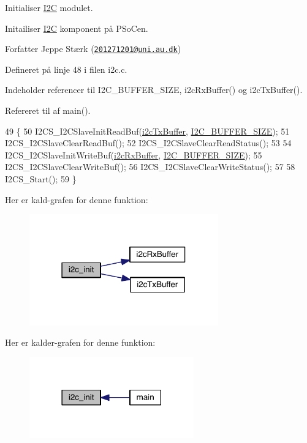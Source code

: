 Initialiser \hyperlink{class_i2_c}{I2C} modulet. 

Initailiser \hyperlink{class_i2_c}{I2C} komponent på P\+SoC\textquotesingle{}en.

\begin{DoxyAuthor}{Forfatter}
Jeppe Stærk (\href{mailto:201271201@uni.au.dk}{\tt 201271201@uni.\+au.\+dk}) 
\end{DoxyAuthor}


Defineret på linje 48 i filen i2c.\+c.



Indeholder referencer til I2\+C\+\_\+\+B\+U\+F\+F\+E\+R\+\_\+\+S\+I\+ZE, i2c\+Rx\+Buffer() og i2c\+Tx\+Buffer().



Refereret til af main().


\begin{DoxyCode}
49 \{
50   I2CS\_I2CSlaveInitReadBuf(\hyperlink{class_i2_c_a58ba88cddd7843f12a40a87c998f00da}{i2cTxBuffer}, \hyperlink{i2c_8h_a6458dbf193a0eef0470fc1b08400bfcd}{I2C\_BUFFER\_SIZE});
51   I2CS\_I2CSlaveClearReadBuf();
52   I2CS\_I2CSlaveClearReadStatus();
53   
54   I2CS\_I2CSlaveInitWriteBuf(\hyperlink{class_i2_c_a711782550427eea544dabe5394d79a9b}{i2cRxBuffer}, \hyperlink{i2c_8h_a6458dbf193a0eef0470fc1b08400bfcd}{I2C\_BUFFER\_SIZE});
55   I2CS\_I2CSlaveClearWriteBuf();
56   I2CS\_I2CSlaveClearWriteStatus();
57   
58   I2CS\_Start();
59 \}
\end{DoxyCode}


Her er kald-\/grafen for denne funktion\+:
\nopagebreak
\begin{figure}[H]
\begin{center}
\leavevmode
\includegraphics[width=231pt]{d4/d47/class_i2_c_a64303230bf4843297e7ac37ac236ca04_cgraph}
\end{center}
\end{figure}




Her er kalder-\/grafen for denne funktion\+:
\nopagebreak
\begin{figure}[H]
\begin{center}
\leavevmode
\includegraphics[width=201pt]{d4/d47/class_i2_c_a64303230bf4843297e7ac37ac236ca04_icgraph}
\end{center}
\end{figure}


